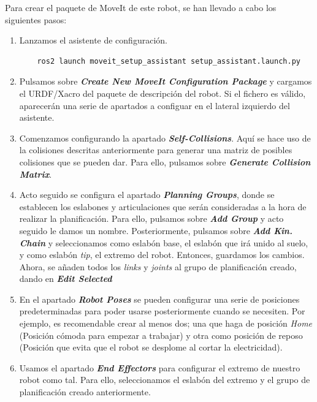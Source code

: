 Para crear el paquete de MoveIt de este robot, se han llevado a cabo los siguientes pasos:
\begin{enumerate}
\item Lanzamos el asistente de configuración.
\begin{verbatim}
    ros2 launch moveit_setup_assistant setup_assistant.launch.py
\end{verbatim}
\item Pulsamos sobre \textbf{\textit{\guillemotleft Create New MoveIt Configuration Package\guillemotright}} y cargamos el URDF/Xacro del paquete de descripción 
del robot. Si el fichero es válido, aparecerán una serie de apartados a configuar en el lateral izquierdo del asistente. 
\item Comenzamos configurando la apartado \textbf{\textit{\guillemotleft Self-Collisions\guillemotright}}. Aquí se hace uso de la colisiones 
descritas anteriormente para generar una matriz de posibles colisiones que se pueden dar. Para ello, pulsamos sobre
\textbf{\textit{\guillemotleft Generate Collision Matrix\guillemotright}}.
\item Acto seguido se configura el apartado \textbf{\textit{\guillemotleft Planning Groups\guillemotright}}, donde se establecen los eslabones y articulaciones que serán consideradas 
a la hora de realizar la planificación. Para ello, pulsamos sobre \textbf{\textit{\guillemotleft Add Group\guillemotright}} y acto seguido 
le damos un nombre. Posteriormente, pulsamos sobre \textbf{\textit{\guillemotleft Add Kin. Chain\guillemotright}} y seleccionamos como 
eslabón base, el eslabón que irá unido al suelo, y como eslabón \textit{tip}, el extremo del robot. Entonces, guardamos los cambios. Ahora, 
se añaden todos los \textit{links} y \textit{joints} al grupo de planificación creado, dando en \textbf{\textit{\guillemotleft Edit Selected\guillemotright}} 

\item En el apartado \textbf{\textit{\guillemotleft Robot Poses\guillemotright}} se pueden configurar una serie de posiciones predeterminadas 
para poder usarse posteriormente cuando se necesiten. Por ejemplo, es recomendable crear al menos dos; una que haga de posición \textit{Home} 
(Posición cómoda para empezar a trabajar) y otra como posición de reposo (Posición que evita que el robot se desplome al cortar la electricidad).

\item Usamos el apartado \textbf{\textit{\guillemotleft End Effectors \guillemotright}} para configurar el extremo de nuestro robot como tal. Para ello, 
seleccionamos el eslabón del extremo y el grupo de planificación creado anteriormente. 


\end{enumerate}
